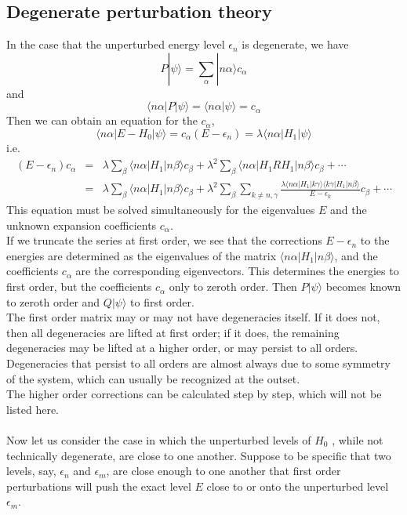 \subsection{Degenerate perturbation theory}
In the case that the unperturbed energy level $\epsilon_n$ is degenerate, we have
\[P|\psi\rangle = \sum_{\alpha} |n\alpha\rangle c_{\alpha}\]
and
\[\langle n\alpha | P |\psi\rangle = \langle n\alpha  |\psi\rangle = c_{\alpha}\]
Then we can obtain an equation for the $c_{\alpha}$,
\[\langle n\alpha | E-H_0 | \psi\rangle = c_{\alpha}(E-\epsilon_n) = \lambda \langle n\alpha | H_1 | \psi\rangle\]
i.e.
\begin{eqnarray}
(E-\epsilon_{n})c_{\alpha} &=& \lambda \sum_{\beta} \langle n\alpha | H_1 | n\beta\rangle c_{\beta} + \lambda^2 \sum_{\beta} \langle n\alpha | H_1RH_1 | n\beta\rangle c_{\beta} + \cdots \\
&=& \lambda \sum_{\beta} \langle n\alpha | H_1 | n\beta\rangle c_{\beta}
+ \lambda^2 \sum_{\beta} \sum_{k\neq n,\gamma}  \frac{\lambda \langle n\alpha | H_1|k\gamma\rangle \langle k\gamma | H_1 | n\beta \rangle}{E-\epsilon_k}c_{\beta} + \cdots \nonumber
\end{eqnarray}
This equation must be solved simultaneously for the eigenvalues $E$ and the unknown expansion coefficients $c_{\alpha}$.\\
If we truncate the series at first order, we see that the corrections $E-\epsilon_{n}$ to the energies are determined as the eigenvalues of the matrix $\langle n\alpha | H_1 | n\beta\rangle$, and the coefficients $c_{\alpha}$ are the corresponding eigenvectors.
This determines the energies to first order, but the coefficients $c_{\alpha}$ only to zeroth order. Then $P|\psi\rangle$ becomes known to zeroth order and $Q|\psi\rangle$ to first order.\\
The first order matrix may or may not have degeneracies itself. If it does not, then all degeneracies are lifted at first order; if it does, the remaining degeneracies may be lifted at a higher order, or may persist to all orders. Degeneracies that persist to all orders are almost always due to some symmetry of the system, which can usually be recognized at the outset.\\
The higher order corrections can be calculated step by step, which will not be listed here.\\ \\
Now let us consider the case in which the unperturbed levels of $H_0$ , while not technically degenerate, are close to one another. Suppose to be specific that two levels, say, $\epsilon_n$ and $\epsilon_m$, are close enough to one another that first order perturbations will push the exact level $E$ close to or onto the unperturbed level $\epsilon_m$.\\
